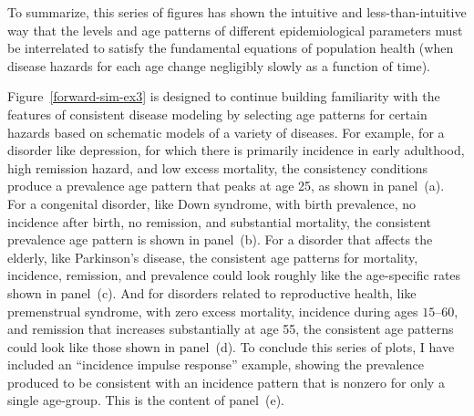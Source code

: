 To summarize, this series of figures has shown the intuitive and
less-than-intuitive way that the levels and age patterns of different
epidemiological parameters must be interrelated to satisfy the
fundamental equations of population health (when disease hazards for
each age change negligibly slowly as a function of time).

Figure~\ref{forward-sim-ex3} is designed to continue building familiarity with the
features of consistent disease modeling by selecting age patterns for
certain hazards based on schematic models of a variety of diseases.  For
example, for a disorder like depression, for which there is primarily
incidence in early adulthood, high remission hazard, and low excess
mortality, the consistency conditions produce a prevalence age pattern
that peaks at age 25, as shown in panel~(a).
For a congenital disorder, like Down syndrome, with birth
prevalence, no incidence after birth, no remission, and substantial
mortality, the consistent prevalence age pattern is shown in
panel~(b).
For a disorder that affects the elderly, like Parkinson's disease, the
consistent age patterns for mortality, incidence, remission, and
prevalence could look roughly like the age-specific rates shown in
panel~(c).
And for disorders related to reproductive health, like premenstrual
syndrome, with zero excess mortality, incidence during ages $15$--$60$, and
remission that increases substantially at age 55, the consistent age
patterns could look like those shown in
panel~(d).
To conclude this series of plots, I have included an ``incidence impulse
response'' example, showing the prevalence produced to be consistent
with an incidence pattern that is nonzero for only a single
age-group. This is the content of
panel~(e).


